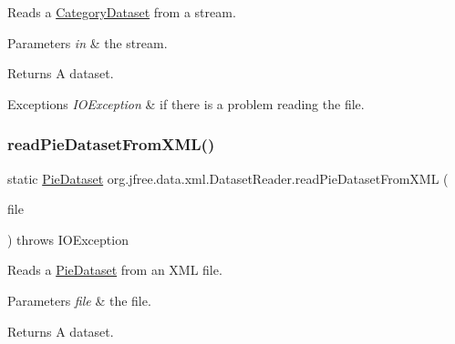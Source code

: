 Reads a \mbox{\hyperlink{}{Category\+Dataset}} from a stream.


\begin{DoxyParams}{Parameters}
{\em in} & the stream.\\
\hline
\end{DoxyParams}
\begin{DoxyReturn}{Returns}
A dataset.
\end{DoxyReturn}

\begin{DoxyExceptions}{Exceptions}
{\em I\+O\+Exception} & if there is a problem reading the file. \\
\hline
\end{DoxyExceptions}
\mbox{\label{classorg_1_1jfree_1_1data_1_1xml_1_1_dataset_reader_a33f34250e5bae5bc925fae02828f2e68}} 
\subsubsection{\texorpdfstring{read\+Pie\+Dataset\+From\+X\+M\+L()}{readPieDatasetFromXML()}\hspace{0.1cm}{\footnotesize\ttfamily [1/2]}}
{\footnotesize\ttfamily static \mbox{\hyperlink{interfaceorg_1_1jfree_1_1data_1_1general_1_1_pie_dataset}{Pie\+Dataset}} org.\+jfree.\+data.\+xml.\+Dataset\+Reader.\+read\+Pie\+Dataset\+From\+X\+ML (\begin{DoxyParamCaption}\item[{File}]{file }\end{DoxyParamCaption}) throws I\+O\+Exception\hspace{0.3cm}{\ttfamily [static]}}

Reads a \mbox{\hyperlink{}{Pie\+Dataset}} from an X\+ML file.


\begin{DoxyParams}{Parameters}
{\em file} & the file.\\
\hline
\end{DoxyParams}
\begin{DoxyReturn}{Returns}
A dataset.
\end{DoxyReturn}


